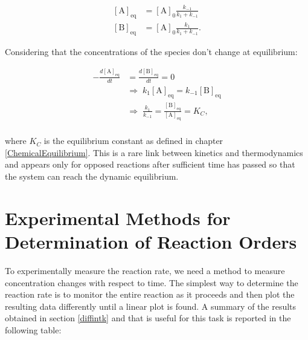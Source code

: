 \documentclass[
  9pt,
]{extbook}
\theoremstyle{definition}
\theoremstyle{definition}
\theoremstyle{definition}
\theoremstyle{definition}
\theoremstyle{remark}
\begin{document}
\begin{equation}
\begin{aligned}
\left[\mathrm{A} \right] _{\mathrm{eq}} &= [\mathrm{A}]_0 \frac{k_{-1}}{k_1+k_{-1}} \\
[\mathrm{B}]_{\mathrm{eq}} &= [\mathrm{A}]_0 \frac{k_{1}}{k_1+k_{-1}}.
\end{aligned}
\label{eq:kinopp3}
\end{equation}

Considering that the concentrations of the species don't change at equilibrium:

\begin{equation}
\begin{aligned}
-\frac{d[\mathrm{A}]_{\mathrm{eq}}}{dt} &= \frac{d[\mathrm{B}]_{\mathrm{eq}}}{dt} = 0\\
& \Rightarrow \; k_1[\mathrm{A}]_{\mathrm{eq}} = k_{-1}[\mathrm{B}]_{\mathrm{eq}} \\
& \Rightarrow \;  \frac{k_1}{k_{-1}} =  \frac{[\mathrm{B}]_{\mathrm{eq}}}{[\mathrm{A}]_{\mathrm{eq}}} = K_C, \\
\end{aligned}
\label{eq:kinopp4}
\end{equation}

where \(K_C\) is the equilibrium constant as defined in chapter \ref{ChemicalEquilibrium}. This is a rare link between kinetics and thermodynamics and appears only for opposed reactions after sufficient time has passed so that the system can reach the dynamic equilibrium.

\section{Experimental Methods for Determination of Reaction Orders}\label{experimental-methods-for-determination-of-reaction-orders}

To experimentally measure the reaction rate, we need a method to measure concentration changes with respect to time. The simplest way to determine the reaction rate is to monitor the entire reaction as it proceeds and then plot the resulting data differently until a linear plot is found. A summary of the results obtained in section \ref{diffintk} and that is useful for this task is reported in the following table:

\tiny
\end{document}
